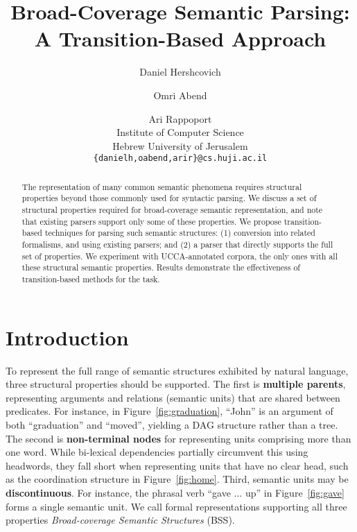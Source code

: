 \documentclass[11pt]{article}
\title{Broad-Coverage Semantic Parsing: A Transition-Based Approach}
\author{Daniel Hershcovich \and Omri Abend \and Ari Rappoport \\
  Institute of Computer Science \\
  Hebrew University of Jerusalem \\
  {\tt \{danielh,oabend,arir\}@cs.huji.ac.il}
}
\date{}
\newcommand{\figref}[1]{Figure~\ref{#1}}
\begin{document}
\maketitle

\vspace{-2cm}
\begin{abstract}

  The representation of many common semantic phenomena requires 
  structural properties beyond those commonly used for syntactic parsing.
  We discuss a set of structural properties required for
  broad-coverage semantic representation, and note that existing
  parsers support only some of these properties.
  We propose transition-based techniques for parsing such semantic structures:
  (1) conversion into related formalisms, and using existing parsers;
  and (2) a parser that directly supports the full set of properties.
  We experiment with UCCA-annotated corpora, the only ones with all these
  structural semantic properties. Results demonstrate the effectiveness
  of transition-based methods for the task.
  
\end{abstract}



\section{Introduction}

To represent the full range of semantic structures exhibited by
natural language, three structural properties should be supported.
The first is \textbf{multiple parents},
representing arguments and relations (semantic units) that are shared between predicates.
For instance, in \figref{fig:graduation}, ``John'' is an argument of both ``graduation''
and ``moved'', yielding a DAG structure rather than a tree.
The second is \textbf{non-terminal nodes} for representing units
comprising more than one word.
While bi-lexical dependencies partially circumvent this
using headwords, they fall short when representing units that have no clear head,
such as the coordination structure in \figref{fig:home}.
Third, semantic units may be \textbf{discontinuous}.
For instance, the phrasal verb ``gave ... up'' in \figref{fig:gave} forms a single semantic unit.
We call formal representations supporting all three properties 
{\it Broad-coverage Semantic Structures} (BSS).
\end{document}
